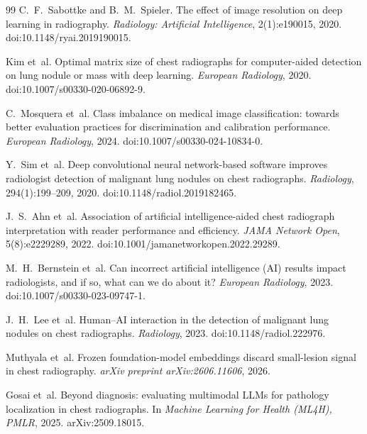 {\begin{thebibliography}{99}
C.~F.~Sabottke and B.~M.~Spieler.
\newblock The effect of image resolution on deep learning in radiography.
\newblock \emph{Radiology: Artificial Intelligence}, 2(1):e190015, 2020. doi:10.1148/ryai.2019190015.

Kim et~al.
\newblock Optimal matrix size of chest radiographs for computer-aided detection on lung nodule or mass with deep learning.
\newblock \emph{European Radiology}, 2020. doi:10.1007/s00330-020-06892-9.

C.~Mosquera et~al.
\newblock Class imbalance on medical image classification: towards better evaluation practices for discrimination and calibration performance.
\newblock \emph{European Radiology}, 2024. doi:10.1007/s00330-024-10834-0.

Y.~Sim et~al.
\newblock Deep convolutional neural network-based software improves radiologist detection of malignant lung nodules on chest radiographs.
\newblock \emph{Radiology}, 294(1):199--209, 2020. doi:10.1148/radiol.2019182465.

J.~S.~Ahn et~al.
\newblock Association of artificial intelligence-aided chest radiograph interpretation with reader performance and efficiency.
\newblock \emph{JAMA Network Open}, 5(8):e2229289, 2022. doi:10.1001/jamanetworkopen.2022.29289.

M.~H.~Bernstein et~al.
\newblock Can incorrect artificial intelligence (AI) results impact radiologists, and if so, what can we do about it?
\newblock \emph{European Radiology}, 2023. doi:10.1007/s00330-023-09747-1.

J.~H.~Lee et~al.
\newblock Human--AI interaction in the detection of malignant lung nodules on chest radiographs.
\newblock \emph{Radiology}, 2023. doi:10.1148/radiol.222976.

Muthyala et~al.
\newblock Frozen foundation-model embeddings discard small-lesion signal in chest radiography.
\newblock \emph{arXiv preprint arXiv:2606.11606}, 2026.

Gosai et~al.
\newblock Beyond diagnosis: evaluating multimodal LLMs for pathology localization in chest radiographs.
\newblock In \emph{Machine Learning for Health (ML4H), PMLR}, 2025. arXiv:2509.18015.


\end{thebibliography}}
